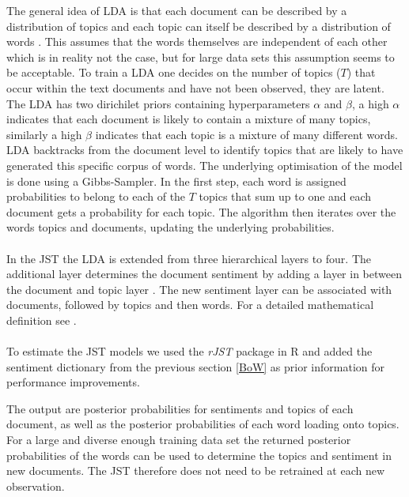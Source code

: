 The general idea of LDA is that each document can be described by a distribution of topics and each topic can itself be described by a distribution of words \citep{blei2003latent}. This assumes that the words themselves are independent of each other which is in reality not the case, but for large data sets this assumption seems to be acceptable. To train a LDA one decides on the number of topics ($T$) that occur within the text documents and have not been observed, they are latent. The LDA has two dirichilet priors containing hyperparameters $\alpha$ and $\beta$, a high $\alpha$ indicates that each document is likely to contain a mixture of many topics, similarly a high $\beta$ indicates that each topic is a mixture of many different words. LDA backtracks from the document level to identify topics that are likely to have generated this specific corpus of words. The underlying optimisation of the model is done using a Gibbs-Sampler. In the first step, each word is assigned probabilities to belong to each of the $T$ topics that sum up to one and each document gets a probability for each topic. The algorithm then iterates over the words topics and documents, updating the underlying probabilities. \\ \\
In the JST the LDA is extended from three hierarchical layers to four. The additional layer determines the document sentiment by adding a layer in between the document and topic layer \citep{lin2009joint}. The new sentiment layer can be associated with documents, followed by topics and then words. For a detailed mathematical definition see \citet{lin2009joint}. \\ \\
To estimate the JST models we used the \textit{rJST} package in R \citep{rJST} and added the sentiment dictionary from the previous section \ref{BoW} as prior information for performance improvements.

The output are posterior probabilities for sentiments and topics of each document, as well as the posterior probabilities of each word loading onto topics. For a large and diverse enough training data set the returned posterior probabilities of the words can be used to determine the topics and sentiment in new documents. The JST therefore does not need to be retrained at each new observation. \\ \\


